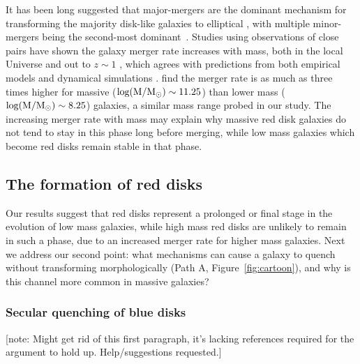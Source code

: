 \documentclass[useAMS,usenatbib]{mn2e}
\begin{document}
It has been long suggested that major-mergers are the dominant mechanism for transforming the majority disk-like galaxies to elliptical \citep{Toomre1977,Schweizer1982,Schweizer1990}, with multiple minor-mergers being the second-most dominant~\citep{Bundy2009,Hopkins2010b}. Studies using observations of close pairs have shown the galaxy merger rate increases with mass, both in the local Universe \citep{Xu2004,Patton2008,Domingue2009,Robotham2014,Casteels2014} and out to $z\sim1$ \citep{Xu2012,Bundy2009}, which agrees with predictions from both empirical models and dynamical simulations \citep{Hopkins2010a,Hopkins2010b,Maller2006}. \citet{Casteels2014} find the merger rate is as much as three times higher for massive ($\rm log(M/M_{\odot})\sim11.25$) than lower mass ($\rm log(M/M_{\odot})\sim8.25$) galaxies, a similar mass range probed in our study. The increasing merger rate with mass may explain why massive red disk galaxies do not tend to stay in this phase long before merging, while low mass galaxies which become red disks remain stable in that phase. 


\subsection{The formation of red disks}

Our results suggest that red disks represent a prolonged or final stage in the evolution of low mass galaxies, while high mass red disks are unlikely to remain in such a phase, due to an increased merger rate for higher mass galaxies. Next we address our second point: what mechanisms can cause a galaxy to quench without transforming morphologically (Path A, Figure~\ref{fig:cartoon}), and why is this channel more common in massive galaxies? 
 
\subsubsection{Secular quenching of blue disks}

[note: Might get rid of this first paragraph, it's lacking references required for the argument to hold up. Help/suggestions requested.]
\end{document}
